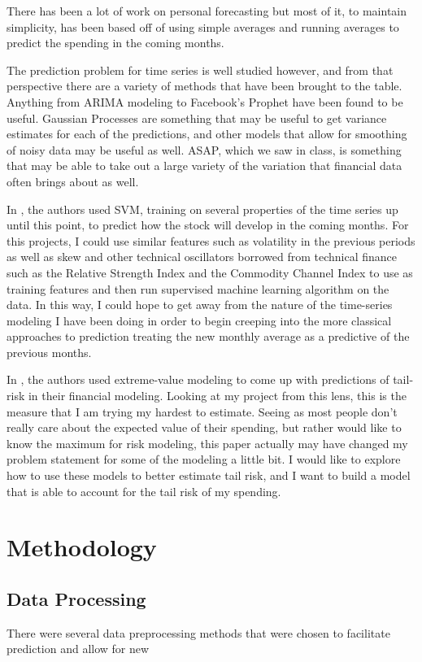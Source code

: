 \documentclass[11pt,a4paper]{article}
\begin{document}
There has been a lot of work on personal forecasting but most of it, to maintain simplicity, has been based off of using simple averages and running averages to predict the spending in the coming months. 


The prediction problem for time series is well studied however, and from that perspective there are a variety of methods that have been brought to the table. Anything from ARIMA modeling to Facebook's Prophet have been found to be useful. Gaussian Processes are something that may be useful to get variance estimates for each of the predictions, and other models that allow for smoothing of noisy data may be useful as well. ASAP, which we saw in class, is something that may be able to take out a large variety of the variation that financial data often brings about as well. 

In \cite{SVMFinance}, the authors used SVM, training on several properties of the time series up until this point, to predict how the stock will develop in the coming months. For this projects, I could use similar features such as volatility in the previous periods as well as skew and other technical oscillators borrowed from technical finance such as the Relative Strength Index and the Commodity Channel Index to use as training features and then run supervised machine learning algorithm on the data. In this way, I could hope to get away from the nature of the time-series modeling I have been doing in order to begin creeping into the more classical approaches to prediction treating the new monthly average as a predictive of the previous months. 

In \cite{LongTail}, the authors used extreme-value modeling to come up with predictions of tail-risk in their financial modeling. Looking at my project from this lens, this is the measure that I am trying my hardest to estimate. Seeing as most people don't really care about the expected value of their spending, but rather would like to know the maximum for risk modeling, this paper actually may have changed my problem statement for some of the modeling a little bit. I would like to explore how to use these models to better estimate tail risk, and I want to build a model that is able to account for the tail risk of my spending. 


\section{Methodology} \label{sec:methodology}

\subsection{Data Processing}
There were several data preprocessing methods that were chosen to facilitate prediction and allow for new 
\end{document}
